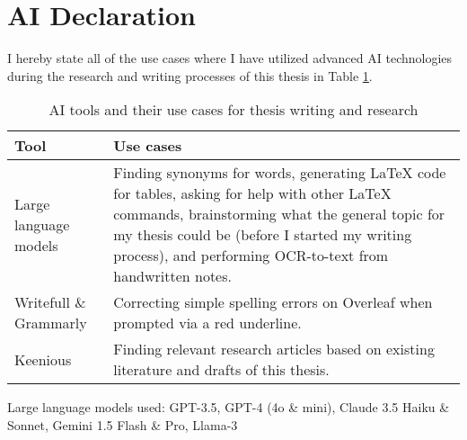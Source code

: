 


\chapter*{AI Declaration\label{extra:declaration}}
\begin{comment}
\end{comment}


I hereby state all of the use cases where I have utilized advanced AI technologies during the research and writing processes of this thesis in Table \ref{table:declaration}.


\begin{table}[h!]  
\renewcommand{\arraystretch}{1.5} %
\setlength{\tabcolsep}{5pt} %
\begin{tabularx}{\textwidth}{|l|X|} %
\hline  
\textbf{Tool} & \textbf{Use cases} \\ \hline  
Large language models & Finding synonyms for words, generating LaTeX code for tables, asking for help with other LaTeX commands, brainstorming what the general topic for my thesis could be (before I started my writing process), and performing OCR-to-text from handwritten notes. \\ \hline  
Writefull \& Grammarly & Correcting simple spelling errors on Overleaf when prompted via a red underline. \\ \hline  
Keenious & Finding relevant research articles based on existing literature and drafts of this thesis. \\ \hline  
\end{tabularx}  
\caption{AI tools and their use cases for thesis writing and research}  
\label{table:declaration}  
\end{table}  

Large language models used: GPT-3.5, GPT-4 (4o \& mini), Claude 3.5 Haiku \& Sonnet, Gemini 1.5 Flash \& Pro, Llama-3
